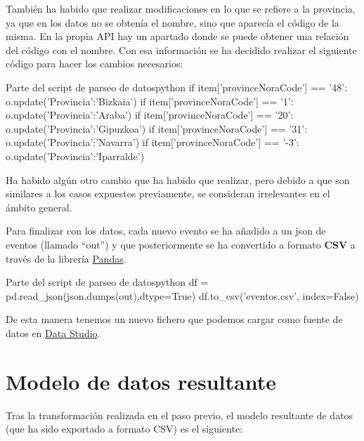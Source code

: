 \documentclass{\ClassPath/viu-tfm-template}
\begin{document}
También ha habido que realizar modificaciones en lo que se refiere a la provincia, ya que en los datos no se obtenía el nombre, sino que aparecía el código de la misma. En la propia API hay un apartado donde se puede obtener una relación del código con el nombre. Con esa información se ha decidido realizar el siguiente código para hacer los cambios necesarios:

\begin{mycode}{Parte del script de parseo de datos}{python}{}
if item['provinceNoraCode'] == '48':
    o.update({'Provincia':'Bizkaia'})
if item['provinceNoraCode'] == '1':
    o.update({'Provincia':'Araba'})
if item['provinceNoraCode'] == '20':
    o.update({'Provincia':'Gipuzkoa'})
if item['provinceNoraCode'] == '31':
    o.update({'Provincia':'Navarra'})
if item['provinceNoraCode'] == '-3':
    o.update({'Provincia':'Iparralde'})
\end{mycode}


Ha habido algún otro cambio que ha habido que realizar, pero debido a que son similares a los casos expuestos previamente, se consideran irrelevantes en el ámbito general.

Para finalizar con los datos, cada nuevo evento se ha añadido a un json de eventos (llamado “out”) y que posteriormente se ha convertido a formato \textbf{CSV} a través de la librería \href{https://pandas.pydata.org/}{Pandas}.

\begin{mycode}{Parte del script de parseo de datos}{python}{}
df = pd.read_json(json.dumps(out),dtype=True)
df.to_csv('eventos.csv', index=False)
\end{mycode}

De esta manera tenemos un nuevo fichero  que podemos cargar como fuente de datos en \href{https://datastudio.google.com/}{Data Studio}.

\section{Modelo de datos resultante}

Tras la transformación realizada en el paso previo, el modelo resultante de datos (que ha sido exportado a formato CSV) es el siguiente:
\end{document}
